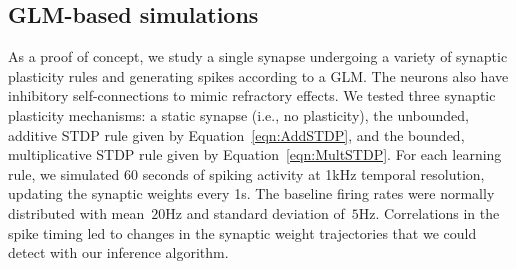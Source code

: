\subsection{GLM-based simulations}
As a proof of concept, we study a single synapse undergoing a variety of synaptic plasticity rules and generating spikes according to a GLM. The neurons also have inhibitory self-connections to mimic refractory effects. We tested three synaptic plasticity mechanisms: a static synapse (i.e., no plasticity), the unbounded, additive STDP rule given by Equation~\ref{eqn:AddSTDP}, and the bounded, multiplicative STDP rule given by Equation~\ref{eqn:MultSTDP}. For each learning rule, we simulated 60 seconds of spiking activity at 1kHz temporal resolution, updating the synaptic weights every 1s. The baseline firing rates were normally distributed with mean~$20$Hz and standard deviation of~$5$Hz. Correlations in the spike timing led to changes in the synaptic weight trajectories that we could detect with our inference algorithm.

